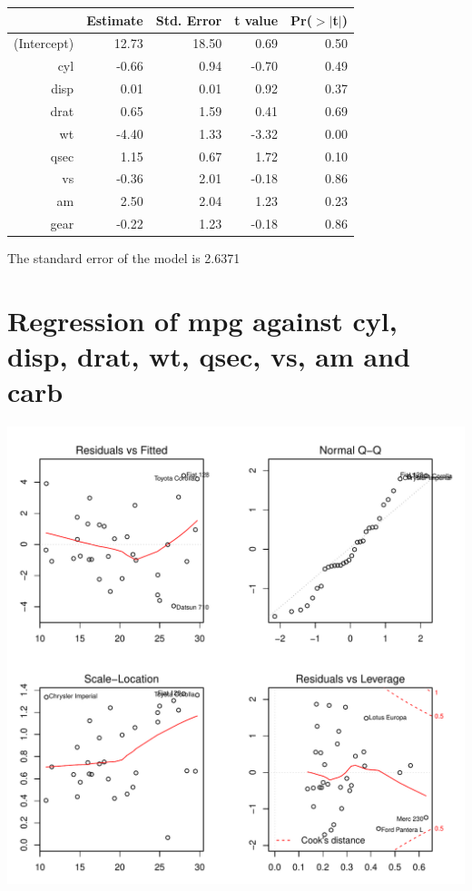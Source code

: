 \documentclass{article}\usepackage[]{graphicx}\usepackage[]{color}
\makeatletter
\def\maxwidth{ %
  \ifdim\Gin@nat@width>\linewidth
    \linewidth
  \else
    \Gin@nat@width
  \fi
}
\newenvironment{knitrout}{}{} %
\makeatother
\begin{document}
\begin{table}[ht]
\centering
\begin{tabular}{rrrrr}
  \hline
 & Estimate & Std. Error & t value & Pr($>$$|$t$|$) \\ 
  \hline
(Intercept) & 12.73 & 18.50 & 0.69 & 0.50 \\ 
  cyl & -0.66 & 0.94 & -0.70 & 0.49 \\ 
  disp & 0.01 & 0.01 & 0.92 & 0.37 \\ 
  drat & 0.65 & 1.59 & 0.41 & 0.69 \\ 
  wt & -4.40 & 1.33 & -3.32 & 0.00 \\ 
  qsec & 1.15 & 0.67 & 1.72 & 0.10 \\ 
  vs & -0.36 & 2.01 & -0.18 & 0.86 \\ 
  am & 2.50 & 2.04 & 1.23 & 0.23 \\ 
  gear & -0.22 & 1.23 & -0.18 & 0.86 \\ 
   \hline
\end{tabular}
\end{table}




The standard error of the model is 2.6371

\newpage

\section{Regression of mpg against cyl, disp, drat, wt, qsec, vs, am and carb }
\begin{knitrout}
\color{fgcolor}

{\centering \includegraphics[width=\maxwidth]{figure/lm-cyl-disp-drat-wt-qsec-vs-am-carb} 

}



\end{knitrout}
\end{document}
